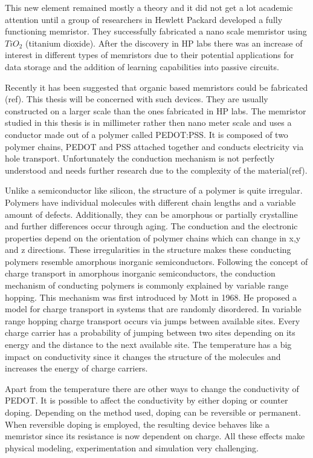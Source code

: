 \begin{doublespace}
This new element remained mostly a theory and it did not get a lot academic attention until a group of researchers in Hewlett Packard developed a fully functioning memristor. They successfully fabricated a nano scale memristor using $TiO_2$ (titanium dioxide). After the discovery in HP labs there was an increase of interest in different types of memristors due to their potential applications for data storage and the addition of learning capabilities into passive circuits. 

Recently it has been suggested that organic based memristors could be fabricated (ref). This thesis will be concerned with such devices. They are usually constructed on a larger scale than the ones fabricated in HP labs. The memristor studied in this thesis is in millimeter rather then nano meter scale and uses a conductor made out of a polymer called PEDOT:PSS. It is composed of two polymer chains, PEDOT and PSS attached together and conducts electricity via hole transport. Unfortunately the conduction mechanism is not perfectly understood and needs further research due to the complexity of the material(ref).

Unlike a semiconductor like silicon, the structure of a polymer is quite irregular. Polymers have individual molecules with different chain lengths and a variable amount of defects.
Additionally, they can be amorphous or partially crystalline and further differences occur through aging. The conduction and the electronic properties depend on the orientation of polymer chains which can change in x,y and z directions. These irregularities in the structure makes these conducting polymers resemble amorphous inorganic semiconductors. Following the concept of charge transport in amorphous inorganic semiconductors, the conduction mechanism of conducting polymers is commonly explained by variable range hopping. This mechanism was first introduced by Mott in 1968. He proposed a model for charge transport in systems that are randomly disordered. In variable range hopping charge transport occurs via jumps between available sites. Every charge carrier has a probability of jumping between two sites depending on its energy and the distance to the next available site. The temperature has a big impact on conductivity since it changes the structure of the molecules and increases the energy of charge carriers.

Apart from the temperature there are other ways to change the conductivity of PEDOT. It is possible to affect the conductivity by either doping or counter doping. Depending on the method used, doping can be reversible or permanent. When reversible doping is employed, the resulting device behaves like a memristor since its resistance is now dependent on charge. All these effects make physical modeling, experimentation and simulation very challenging. 


\end{doublespace}
